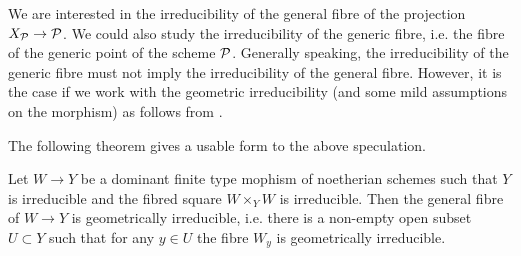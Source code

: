 \begin{remark}
    We are interested in the irreducibility of the general fibre of the projection $X_\P \to \P$. We could also study the irreducibility of the generic fibre, i.e. the fibre of the generic point of the scheme $\P$. Generally speaking, the irreducibility of the generic fibre must not imply the irreducibility of the general fibre. However, it is the case if we work with the geometric irreducibility (and some mild assumptions on the morphism) as follows from \cite[IV.3, 9.7.8]{EGA}. 
\end{remark}

The following theorem gives a usable form to the above speculation.

\begin{theorem}\label{thm:fibre_condition}
    Let $W \to Y$ be a dominant finite type mophism of noetherian schemes such that $Y$ is irreducible and the fibred square $W \times_Y W$ is irreducible. Then the general fibre of $W \to Y$ is geometrically irreducible, i.e. there is a non-empty open subset $U \subset Y$ such that for any $y \in U$ the fibre $W_y$ is geometrically irreducible.
\end{theorem}
